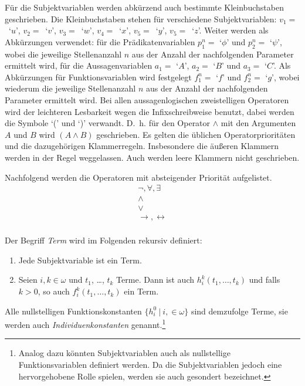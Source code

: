 \documentclass[a4paper,german,10pt,twoside]{book}
\theoremstyle{definition}
\theoremstyle{remark}
\begin{document}
F{\"u}r die Subjektvariablen werden abk{\"u}rzend auch bestimmte Kleinbuchstaben geschrieben. Die Kleinbuchstaben stehen f{\"u}r verschiedene Subjektvariablen: \mbox{$v_1 = $ `$u$'}, \mbox{$v_2 = $ `$v$'}, \mbox{$v_3 = $ `$w$'}, \mbox{$v_4 = $ `$x$'}, \mbox{$v_5 = $ `$y$'}, \mbox{$v_5 = $ `$z$'}. Weiter werden als Abk{\"u}rzungen verwendet: f{\"u}r die Pr{\"a}dikatenvariablen $p^n_1 = $ `$\phi$' und $p^n_2 = $ `$\psi$', wobei die jeweilige Stellenanzahl $n$ aus der Anzahl der nachfolgenden Parameter ermittelt wird, f{\"u}r die Aussagenvariablen $a_1 = $ `$A$', $a_2 = $ `$B$' und $a_3 = $ `$C$'. Als Abk{\"u}rzungen f{\"u}r Funktionsvariablen wird festgelegt $f^n_1 = $ `$f$' und $f^n_2 = $ `$g$', wobei wiederum die jeweilige Stellenanzahl $n$ aus der Anzahl der nachfolgenden Parameter ermittelt wird. Bei allen aussagenlogischen zwei\-stelligen Operatoren wird der leichteren Lesbarkeit wegen die Infixschreibweise benutzt, dabei werden die Symbole `(' und `)' verwandt. 
D.~h. f{\"u}r den Operator $\land$ mit den Argumenten $A$ und $B$ wird $(A \land B)$ geschrieben. 
Es gelten die {\"u}blichen Operatorpriorit{\"a}ten und die dazugeh{\"o}rigen Klammerregeln. Insbesondere die {\"a}u{\ss}eren Klammern werden in der Regel weggelassen. Auch werden leere Klammern nicht geschrieben.

\par
Nachfolgend werden die Operatoren mit absteigender Priorit{\"a}t aufgelistet.
$$
\begin{array}{c}
  \neg, \forall, \exists  \\
  \land \\
  \lor \\
  \rightarrow, \leftrightarrow \\
\end{array}
$$

\par
Der Begriff \emph{Term} wird im Folgenden rekursiv definiert:

\begin{enumerate}
\item Jede Subjektvariable ist ein Term. \item Seien $i, k \in \omega$ und $t_1$, \ldots, $t_k$ Terme. Dann ist auch $h^k_i(t_1, \ldots, t_k)$ und falls $k > 0$, so auch $f^k_i(t_1, \ldots, t_k)$ ein Term.
\end{enumerate}

Alle nullstelligen Funktionskonstanten $\{h^0_i~|~i, \in \omega\}$ sind demzufolge Terme, sie werden auch 
\emph{Individuenkonstanten} genannt.\footnote{Analog dazu k{\"o}nnten Subjektvariablen auch als nullstellige Funktionsvariablen definiert werden. Da die Subjektvariablen jedoch eine hervorgehobene Rolle spielen, werden sie auch gesondert bezeichnet.}
\end{document}
